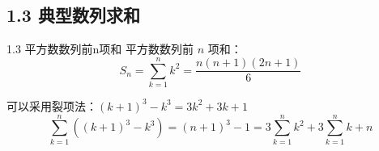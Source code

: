 \documentclass{ctexart}
\begin{document}
\subsection*{1.3 典型数列求和}

\begin{bluetheorem}{1.3 平方数数列前n项和}
平方数数列前 $n$ 项和：
$$ S_n = \sum_{k=1}^{n} k^2 = \frac{n(n+1)(2n+1)}{6} $$
\end{bluetheorem}

\begin{hintbox}
可以采用裂项法：$(k+1)^3 - k^3 = 3k^2 + 3k + 1$
$$ \sum_{k=1}^{n}((k+1)^3 - k^3) = (n+1)^3 - 1 = 3\sum_{k=1}^{n}k^2 + 3\sum_{k=1}^{n}k + n $$
\end{hintbox}
\end{document}
